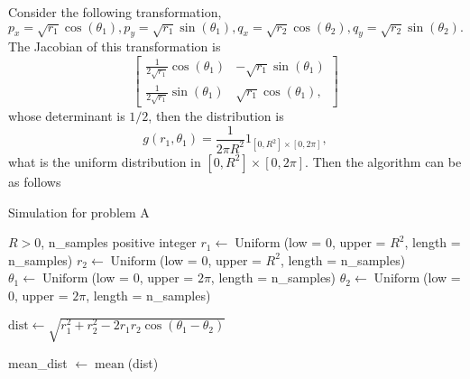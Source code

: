\documentclass[a4paper,10pt, notitlepage]{report}
\begin{document}
\begin{enumerate}
 Consider the following transformation, 
 $$
 p_x = \sqrt{r_1}\cos(\theta_1), p_y = \sqrt{r_1}\sin(\theta_1), q_x = \sqrt{r_2}\cos(\theta_2), q_y = \sqrt{r_2}\sin(\theta_2).
 $$
 The Jacobian of this transformation is 
 $$
 \begin{bmatrix}
    \frac{1}{2\sqrt{r_1}}\cos(\theta_1) & -\sqrt{r_1}\sin(\theta_1) \\
    \frac{1}{2\sqrt{r_1}}\sin(\theta_1) & \sqrt{r_1}\cos(\theta_1),
\end{bmatrix}
 $$
 whose determinant is $1/2$, then the distribution is 
 $$
 g(r_1, \theta_1) = \frac{1}{2\pi R^2}1_{[0,R^2] \times [0,2\pi]}, 
 $$
 what is the uniform distribution in $[0,R^2] \times [0,2\pi]$. Then the
 algorithm can be as follows

 \begin{algorithm}
    \caption{Simulation for problem A}\label{alg:problem-A}
    \begin{algorithmic}
    \Require $R > 0$, n\_samples positive integer
    \State $r_1 \gets \operatorname{Uniform}$(low = 0, upper = $R^2$, length = n\_samples)
    \State $r_2 \gets \operatorname{Uniform}$(low = 0, upper = $R^2$, length = n\_samples)
    \State $\theta_1 \gets \operatorname{Uniform}$(low = 0, upper = $2\pi$,
    length = n\_samples)
    \State $\theta_2 \gets \operatorname{Uniform}$(low = 0, upper = $2\pi$,
    length = n\_samples)
    
    \State $\text{dist} \gets \sqrt{r_1^2 + r_2^2 - 2r_1r_2\cos(\theta_1 -
    \theta_2)}$ 

    \State mean\_dist $\gets \operatorname{mean}$(dist)

    \end{algorithmic}
    \end{algorithm}
\end{enumerate}

% 


\end{document}

